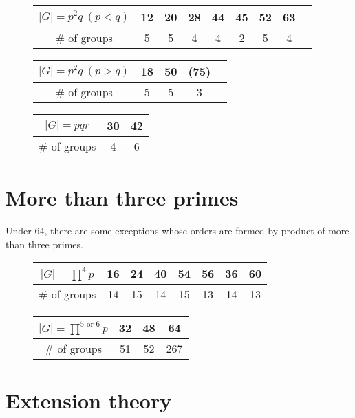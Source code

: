 \documentclass{../note}
\begin{document}
\begin{ex}[$|G|=pqr$]
\end{ex}



\begin{figure}[h!]
\begin{tabular}{c|c|ccccccc}
\hline
$|G|=p^2q\ (p<q)$&12&20&28&44&45&52&63\\
\hline
$\#$ of groups&5&5&4&4&2&5&4\\
\hline
\end{tabular}
\vspace{10pt}

\begin{tabular}{c|cccc}
\hline
$|G|=p^2q\ (p>q)$&18&50&(75)\\
\hline
$\#$ of groups&5&5&3\\
\hline
\end{tabular}
\hspace{10pt}
\begin{tabular}{c|cc}
\hline
$|G|=pqr$&30&42\\
\hline
$\#$ of groups&4&6\\
\hline
\end{tabular}
\end{figure}




\section{More than three primes}
Under 64, there are some exceptions whose orders are formed by product of more than three primes.
\begin{figure}[h!]
\begin{tabular}{c|c|cccc|c|c}
\hline
$|G|=\prod^4p$&16&24&40&54&56&36&60\\
\hline
$\#$ of groups&14&15&14&15&13&14&13\\
\hline
\end{tabular}
\vspace{10pt}

\begin{tabular}{c|c|c||c}
\hline
$|G|=\prod^{5\text{ or }6}p$&32&48&64\\
\hline
$\#$ of groups&51&52&267\\
\hline
\end{tabular}
\end{figure}






\section{Extension theory}
\end{document}
